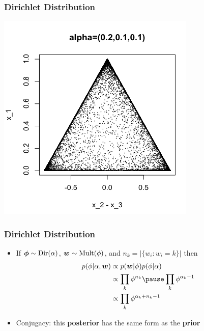 \begin{frame}
\frametitle{Dirichlet Distribution}
\begin{center}
\includegraphics[width=0.5\linewidth]{topic_models/sparsity}
\end{center}
\end{frame}

\fi
\ifconjugacy

\begin{frame}
\frametitle{Dirichlet Distribution}
\begin{itemize}
  \item If ${\mbox{\boldmath$\phi$}} \sim \mathrm{Dir}(\alpha)$, ${\mbox{\boldmath$w$}} \sim \mathrm{Mult}(\phi)$, and $n_k = |\{ w_i : w_i = k\}|$ then
  \begin{align}
  	p(\phi | \alpha, {\bm w}) & \propto p({\bm w} | \phi) p(\phi | \alpha) \\
	                       & \propto  \prod_{k} \phi^{n_k} \pause  \prod_k { \phi^{\alpha_k - 1}} \\
	                       & \propto \prod_k \phi^{\alpha_k + n_k - 1}
  \end{align}
  \item Conjugacy: this {\bf posterior} has the same form as the {\bf prior}
\end{itemize}
\end{frame}

\fi

\ifhighlevel

\else

